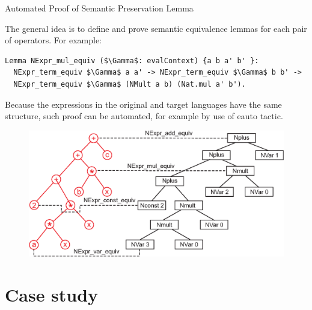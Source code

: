 \documentclass[aspectratio=169]{beamer}
\begin{document}
\begin{frame}[fragile]{Automated Proof of Semantic Preservation Lemma}

  The general idea is to define and prove semantic
  equivalence lemmas for each pair of operators. For example:

  \begin{lstlisting}[language=Coq, mathescape=true,frame=single, basicstyle=\footnotesize]
Lemma NExpr_mul_equiv ($\Gamma$: evalContext) {a b a' b' }:
  NExpr_term_equiv $\Gamma$ a a' -> NExpr_term_equiv $\Gamma$ b b' ->
  NExpr_term_equiv $\Gamma$ (NMult a b) (Nat.mul a' b').
\end{lstlisting}

Because the expressions in the original and target languages have the
same structure, such proof can be automated, for example by use of
{eauto} tactic.
  
  \begin{figure}[h]
    \includegraphics[width=0.5\columnwidth]{figures/trees.eps}
  \end{figure}

\end{frame}


\section{Case study}
\end{document}
